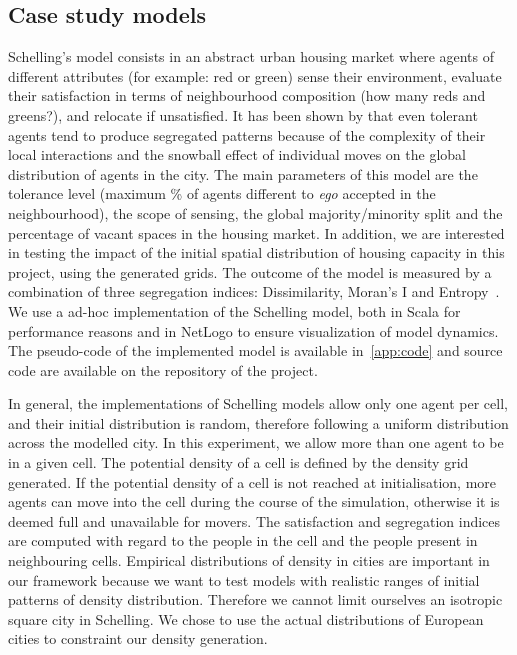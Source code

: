 \documentclass{JASSS}
\begin{document}
\subsection{Case study models}

Schelling's model consists in an abstract urban housing market where agents of different attributes (for example: red or green) sense their environment, evaluate their satisfaction in terms of neighbourhood composition (how many reds and greens?), and relocate if unsatisfied. It has been shown by \cite{Schelling1969} that even tolerant agents tend to produce segregated patterns because of the complexity of their local interactions and the snowball effect of individual moves on the global distribution of agents in the city. The main parameters of this model are the tolerance level (maximum \% of agents different to {\it ego} accepted in the neighbourhood), the scope of sensing, the global majority/minority split and the percentage of vacant spaces in the housing market. In addition, we are interested in testing the impact of the initial spatial distribution of housing capacity in this project, using the generated grids. The outcome of the model is measured by a combination of three segregation indices: Dissimilarity, Moran's I and Entropy~\citep{brown2006spatial}. We use a ad-hoc implementation of the Schelling model, both in Scala for performance reasons and in NetLogo to ensure visualization of model dynamics. The pseudo-code of the implemented model is available in~\ref{app:code} and source code are available on the repository of the project.


In general, the implementations of Schelling models allow only one agent per cell, and their initial distribution is random, therefore following a uniform distribution across the modelled city. In this experiment, we allow more than one agent to be in a given cell. The potential density of a cell is defined by the density grid generated. If the potential density of a cell is not reached at initialisation, more agents can move into the cell during the course of the simulation, otherwise it is deemed full and unavailable for movers. The satisfaction and segregation indices are computed with regard to the people in the cell and the people present in neighbouring cells. Empirical distributions of density in cities are important in our framework because we want to test models with realistic ranges of initial patterns of density distribution. Therefore we cannot limit ourselves an isotropic square city in Schelling. We chose to use the actual distributions of European cities to constraint our density generation.
\end{document}
